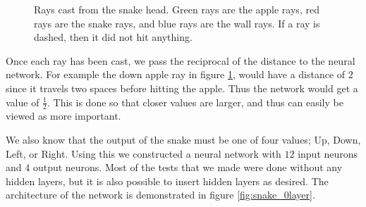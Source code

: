 \documentclass{amsart}
\begin{document}
\begin{figure}[htpb]
  \begin{center}
  \end{center}
  \caption{Rays cast from the snake head. Green rays are the apple rays, red
    rays are the snake rays, and blue rays are the wall rays. If a ray is dashed,
  then it did not hit anything.}
  \label{fig:snake_rays}
\end{figure}

Once each ray has been cast, we pass the reciprocal of the distance to the
neural network. For example the down apple ray in figure \ref{fig:snake_rays},
would have a distance of $2$ since it travels two spaces before hitting the
apple. Thus the network would get a value of $\frac{1}{2}$. This is done so
that closer values are larger, and thus can easily be viewed as more important.

We also know that the output of the snake must be one of four values; Up, Down,
Left, or Right. Using this we constructed a neural network with $12$ input
neurons and $4$ output neurons. Most of the tests that we made were done
without any hidden layers, but it is also possible to insert hidden layers as
desired. The architecture of the network is demonstrated in figure
\ref{fig:snake_0layer}.
\end{document}
